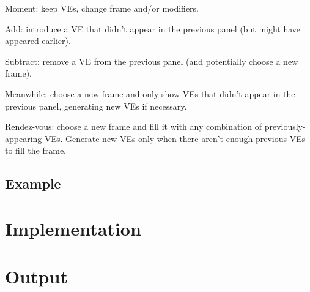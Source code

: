 
Moment: keep VEs, change frame and/or modifiers.

Add: introduce a VE that didn't appear in the previous panel (but might
have appeared earlier).

Subtract: remove a VE from the previous panel (and potentially choose a new
frame).

Meanwhile: choose a new frame and only show VEs that didn't appear in the
previous panel, generating new VEs if necessary.

Rendez-vous: choose a new frame and fill it with any combination of
previously-appearing VEs. Generate new VEs only when there aren't enough
previous VEs to fill the frame.


\subsection{Example}

\section{Implementation}

\section{Output}
